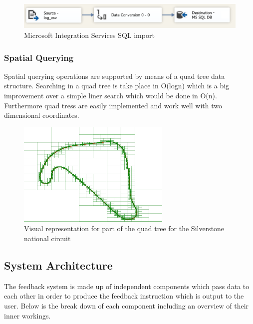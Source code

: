 \begin{figure}[!htb]
	\centering
	\includegraphics[width=\textwidth]{diagrams/ssis.png}
	\caption{Microsoft Integration Services SQL import}
	\label{fig:ssis}
\end{figure}

\subsubsection{Spatial Querying}
\label{sec:imp-SpatialQuerying}
Spatial querying operations are supported by means of a quad tree data structure. Searching in a quad tree is take place in O(logn) which is a big improvement over a simple liner search which would be done in O(n). Furthermore quad tress are easily implemented and work well with two dimensional coordinates.

\begin{figure}[!htb]
	\centering
	\includegraphics[height=5cm]{images/QuadTree}
	\caption{Visual representation for part of the quad tree for the Silverstone national circuit}
	\label{fig:QuadTree}
\end{figure}

\subsection{System Architecture}
\label{sec:imp-systemArchitecture}
The feedback system is made up of independent components which pass data to each other in order to produce the feedback instruction which is output to the user. Below is the break down of each component including an overview of their inner workings.

